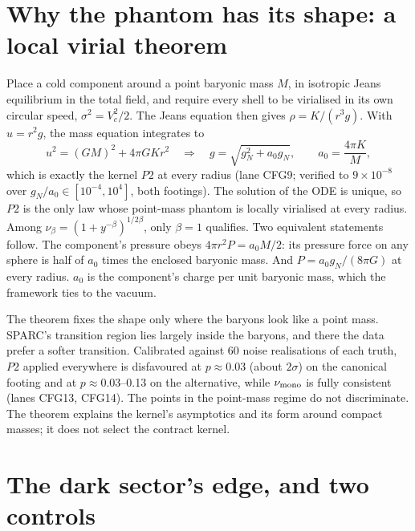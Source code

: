 \documentclass[10pt]{article}
\begin{document}
\section{Why the phantom has its shape: a local virial theorem}\label{sec:virial}

Place a cold component around a point baryonic mass $M$, in isotropic Jeans equilibrium in the total field, and require every shell to be virialised in its own circular speed, $\sigma^2=V_c^2/2$. The Jeans equation then gives $\rho=K/(r^3g)$. With $u=r^2g$, the mass equation integrates to
\begin{equation}
u^2=(GM)^2+4\pi GKr^2\quad\Longrightarrow\quad g=\sqrt{g_N^2+a_0g_N},\qquad a_0=\frac{4\pi K}{M},
\end{equation}
which is exactly the kernel $P2$ at every radius (lane CFG9; verified to $9\times10^{-8}$ over $g_N/a_0\in[10^{-4},10^4]$, both footings). The solution of the ODE is unique, so $P2$ is the only law whose point-mass phantom is locally virialised at every radius. Among $\nu_\beta=(1+y^{-\beta})^{1/2\beta}$, only $\beta=1$ qualifies. Two equivalent statements follow. The component's pressure obeys $4\pi r^2P=a_0M/2$: its pressure force on any sphere is half of $a_0$ times the enclosed baryonic mass. And $P=a_0g_N/(8\pi G)$ at every radius. $a_0$ is the component's charge per unit baryonic mass, which the framework ties to the vacuum.

The theorem fixes the shape only where the baryons look like a point mass. SPARC's transition region lies largely inside the baryons, and there the data prefer a softer transition. Calibrated against 60 noise realisations of each truth, $P2$ applied everywhere is disfavoured at $p\approx0.03$ (about $2\sigma$) on the canonical footing and at $p\approx0.03$--0.13 on the alternative, while $\nu_{\rm mono}$ is fully consistent (lanes CFG13, CFG14). The points in the point-mass regime do not discriminate. The theorem explains the kernel's asymptotics and its form around compact masses; it does not select the contract kernel.

\section{The dark sector's edge, and two controls}\label{sec:edge}
\end{document}
